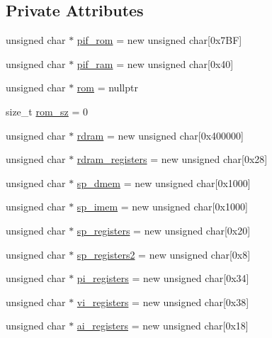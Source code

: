 \subsection*{Private Attributes}
\begin{DoxyCompactItemize}
\item 
unsigned char $\ast$ \hyperlink{classultra64_1_1_m_m_u_a3c06ec9b1a0385a54e46aa1b6763d190}{pif\+\_\+rom} = new unsigned char\mbox{[}0x7\+B\+F\mbox{]}
\item 
unsigned char $\ast$ \hyperlink{classultra64_1_1_m_m_u_a9d041024d1764dde4738d401882e2c75}{pif\+\_\+ram} = new unsigned char\mbox{[}0x40\mbox{]}
\item 
unsigned char $\ast$ \hyperlink{classultra64_1_1_m_m_u_a7ad1ee24b85de6513bf53ba6c963f529}{rom} = nullptr
\item 
size\+\_\+t \hyperlink{classultra64_1_1_m_m_u_afb879907a642040c391b4fce51840564}{rom\+\_\+sz} = 0
\item 
unsigned char $\ast$ \hyperlink{classultra64_1_1_m_m_u_af1ecbc3316b0d24d31ef0c06264cc452}{rdram} = new unsigned char\mbox{[}0x400000\mbox{]}
\item 
unsigned char $\ast$ \hyperlink{classultra64_1_1_m_m_u_ae002e380f5261812fa2a6b37ab6dd9fa}{rdram\+\_\+registers} = new unsigned char\mbox{[}0x28\mbox{]}
\item 
unsigned char $\ast$ \hyperlink{classultra64_1_1_m_m_u_a860851cd6f4767cd238526e6fcadb0dc}{sp\+\_\+dmem} = new unsigned char\mbox{[}0x1000\mbox{]}
\item 
unsigned char $\ast$ \hyperlink{classultra64_1_1_m_m_u_abf6db7a046cc2b6146d3e52327d69bdb}{sp\+\_\+imem} = new unsigned char\mbox{[}0x1000\mbox{]}
\item 
unsigned char $\ast$ \hyperlink{classultra64_1_1_m_m_u_a9ca940d08ce7429fe1cd2440bc508800}{sp\+\_\+registers} = new unsigned char\mbox{[}0x20\mbox{]}
\item 
unsigned char $\ast$ \hyperlink{classultra64_1_1_m_m_u_aad78b94bfb2096b563b7de68cddca76c}{sp\+\_\+registers2} = new unsigned char\mbox{[}0x8\mbox{]}
\item 
unsigned char $\ast$ \hyperlink{classultra64_1_1_m_m_u_a3054f197e8e6b801272dc87d8678aed8}{pi\+\_\+registers} = new unsigned char\mbox{[}0x34\mbox{]}
\item 
unsigned char $\ast$ \hyperlink{classultra64_1_1_m_m_u_ab72c6d87f83e2c99ed0e2e9f43f1f240}{vi\+\_\+registers} = new unsigned char\mbox{[}0x38\mbox{]}
\item 
unsigned char $\ast$ \hyperlink{classultra64_1_1_m_m_u_a30a9501b79dbeffb191b7f89c375e9e0}{ai\+\_\+registers} = new unsigned char\mbox{[}0x18\mbox{]}

\end{DoxyCompactItemize}
